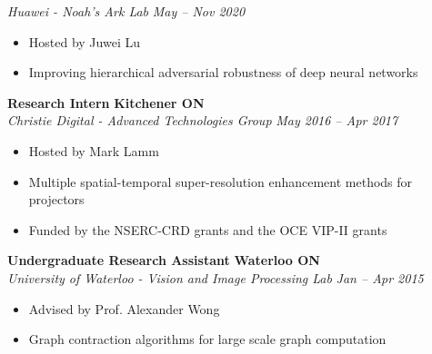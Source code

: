       \textit{Huawei - Noah's Ark Lab}
      \hfill
      \textit{May -- Nov 2020}
      \begin{itemize}
        \setlength\itemsep{0.2em}
        \item Hosted by Juwei Lu
        \item Improving hierarchical adversarial robustness of deep neural networks 
      \end{itemize}
      \vspace{\interlist}
      \textbf{Research Intern}
      \hfill
      \textbf{Kitchener ON}\\
      \textit{Christie Digital - Advanced Technologies Group}
      \hfill
      \textit{May 2016 -- Apr 2017}
      \begin{itemize}
        \setlength\itemsep{0.2em}
        \item Hosted by Mark Lamm
        \item Multiple spatial-temporal super-resolution enhancement methods for projectors
        \item Funded by the NSERC-CRD grants and the OCE VIP-II grants
      \end{itemize}
      \vspace{\interlist}
      \textbf{Undergraduate Research Assistant}
      \hfill
      \textbf{Waterloo ON}\\
      \textit{University of Waterloo - Vision and Image Processing Lab}
      \hfill
      \textit{Jan -- Apr 2015}
      \begin{itemize}
        \setlength\itemsep{0.2em}
        \item Advised by Prof. Alexander Wong
        \item Graph contraction algorithms for large scale graph computation
      \end{itemize}
